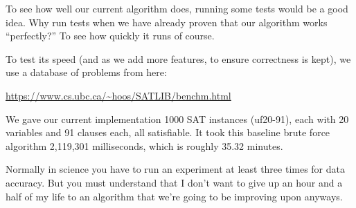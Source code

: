 To see how well our current algorithm does, running some tests would be a
good idea. Why run tests when we have already proven that our algorithm
works ``perfectly?'' To see how quickly it runs of course.

To test its speed (and as we add more features, to ensure correctness is
kept), we use a database of problems from here:

\begin{center}
\url{https://www.cs.ubc.ca/~hoos/SATLIB/benchm.html}
\end{center}

We gave our current implementation 1000 SAT instances (uf20-91), each
with 20 variables and 91 clauses each, all satisfiable. It took this baseline
brute force algorithm 2,119,301 milliseconds, which is roughly 35.32
minutes.

Normally in science you have to run an experiment at least three times for
data accuracy. But you must understand that I don't want to give up an hour
and a half of my life to an algorithm that we're going to be improving upon
anyways.
